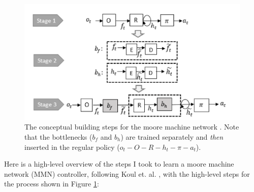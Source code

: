 \begin{figure}
    \centering
    \includegraphics[width=\textwidth]{Figures/net_architecture_overview.png}
    \caption{The conceptual building steps for the moore machine network \cite{Koul2019}. Note that the bottlenecks ($b_f$ and $b_h$) are trained separately and \textit{then} inserted in the regular policy ($o_t-O-R-h_t-\pi-a_t$).}
    \label{fig: net_architecture_overview}
\end{figure}


Here is a high-level overview of the steps I took to learn a
moore machine network (MMN) controller, following Koul et. al. \cite{Koul2019}, with the high-level steps for the process shown in Figure \ref{fig: net_architecture_overview}:


